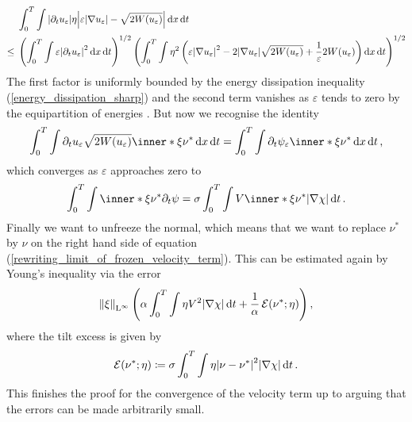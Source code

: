 \begin{align*}
	& 
	\int_{ 0 }^{ T }
	\int
	\abs{ \partial_{ t } u_{ \varepsilon } } \eta
	\abs{ \varepsilon \abs{ \nabla u_{ \varepsilon } } - \sqrt{ 2 W ( u_{ \varepsilon } ) } }
	\dd{ x }
	\dd{ t }
	\\
	\leq{} &
	\left(
	\int_{ 0 }^{ T }
	\int
	\varepsilon 
	\abs{ \partial_{ t } u_{ \varepsilon } }^{ 2 }
	\dd{ x }
	\dd{ t }
	\right)^{ 1/2 }
	\left(
	\int_{ 0 }^{ T }
	\int
	\eta^{ 2 }
	\left(
	\varepsilon \abs{ \nabla u_{ \varepsilon } }^{ 2 }
	-
	2 \abs{ \nabla u_{ \varepsilon } } \sqrt{ 2 W ( u_{ \varepsilon } ) }
	+
	\frac{ 1 }{ \varepsilon }
	2 W ( u_{ \varepsilon } ) 
	\right)
	\dd{ x }
	\dd{ t }
	\right)^{ 1 / 2 }
\end{align*}
The first factor is uniformly bounded by the energy dissipation inequality (\ref{energy_dissipation_sharp}) and the second term vanishes as $ \varepsilon $ tends to zero by the equipartition of energies .
But now we recognise the identity
\begin{equation*}
	\int_{ 0 }^{ T }
	\int
	\partial_{ t } u_{ \varepsilon }
	\sqrt{ 2 W ( u_{ \varepsilon } ) }
	\inner*{ \xi }{ \nu^{ \ast } }
	\dd{ x }
	\dd{ t }
	=
	\int_{ 0 }^{ T }
	\int
	\partial_{ t } \psi_{ \varepsilon }
	\inner*{ \xi }{ \nu^{ \ast } }
	\dd{ x }
	\dd{ t },
\end{equation*}
which converges as $ \varepsilon $ approaches zero to 
\begin{equation}
	\label{rewriting_limit_of_frozen_velocity_term}
	\int_{ 0 }^{ T }
	\int
	\inner*{ \xi }{ \nu^{ \ast } }
	\partial_{ t } \psi
	=
	\sigma
	\int_{ 0 }^{ T }
	\int
	V \inner*{ \xi }{ \nu^{ \ast } }
	\abs{ \nabla \chi }
	\dd{ t }.
\end{equation}
Finally we want to unfreeze the normal, which means that we want to replace $ \nu^{ \ast } $ by $ \nu $ on the right hand side of equation (\ref{rewriting_limit_of_frozen_velocity_term}). This can be estimated again by Young's inequality via the error
\begin{equation*}
	\norm{ \xi }_{ \lp^{ \infty } }
	\left(
	\alpha
	\int_{ 0 }^{ T }
	\int
	\eta
	V^{ 2 }
	\abs{ \nabla \chi }
	\dd{ t }
	+
	\frac{ 1 }{ \alpha }
	\tilt_excess ( \nu^{ \ast }; \eta )
	\right),
\end{equation*}
where the tilt excess is given by 
\begin{equation*}
	\tilt_excess ( \nu^{ \ast } ; \eta )
	\coloneqq
	\sigma
	\int_{ 0 }^{ T }
	\int
	\eta
	\abs{ \nu - \nu^{ \ast } }^{ 2 }
	\abs{ \nabla \chi }
	\dd{ t }.
\end{equation*}
This finishes the proof for the convergence of the velocity term up to arguing that the errors can be made arbitrarily small.

